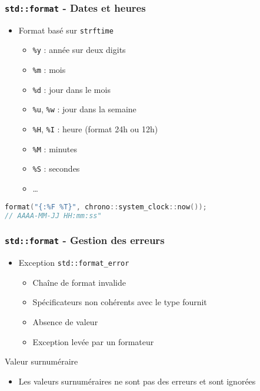 \documentclass[C++.tex]{subfiles}
\begin{document}
\begin{frame}[fragile]
	\frametitle{\lstinline|std::format| - Dates et heures}
	\begin{itemize}
		\item Format basé sur \lstinline|strftime|
		\begin{itemize}
			\item \lstinline|%y| : année sur deux digits
			\item \lstinline|%m| : mois
			\item \lstinline|%d| : jour dans le mois
			\item \lstinline|%u|, \lstinline|%w| : jour dans la semaine


			\item \lstinline|%H|, \lstinline|%I| : heure (format 24h ou 12h)

			
			\item \lstinline|%M| : minutes
			\item \lstinline|%S| : secondes
			\item \ldots
		\end{itemize}
	\end{itemize}

	\begin{lstlisting}[language=C++]
format("{:%F %T}", chrono::system_clock::now());
// AAAA-MM-JJ HH:mm:ss"\end{lstlisting}
\end{frame}

\begin{frame}[fragile]
	\frametitle{\lstinline|std::format| - Gestion des erreurs}
	\begin{itemize}
		\item Exception \lstinline|std::format_error|
		\begin{itemize}
			\item Chaîne de format invalide
			\item Spécificateurs non cohérents avec le type fournit
			\item Absence de valeur
			\item Exception levée par un formateur
		\end{itemize}
	\end{itemize}

	\begin{block}{Valeur surnuméraire}
		\begin{itemize}
			\item Les valeurs surnuméraires ne sont pas des erreurs et sont ignorées
		\end{itemize}
	\end{block}
\end{frame}
\end{document}
